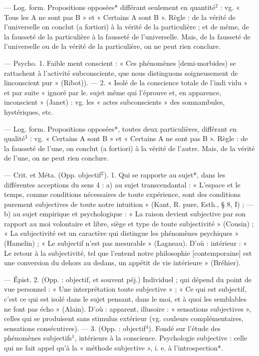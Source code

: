 \begin{itemize}[leftmargin=1cm, label=, itemsep=1pt]
 — Log. form. Propositions opposées* différant seulement en quantité$^2$ : vg.
« Tous les A ne sont pas B » et « Certains A sont B ». Règle : de la vérité
de l’universelle on conclut (a fortiori) à la vérité de la particulière ;
et de même, de la fausseté de la
particulière à la fausseté de l’universelle. Mais, de la fausseté de
l’universelle ou de la vérité de la
particulière, on ne peut rien conclure.

 — Psycho. 1. Faible
ment conscient : « Ces phénomènes
[demi-morbides) se rattachent à
l’activité subconsciente, que nous
distinguons soigneusement de linconscient pur » (Ribot)). — 2. « Isolé
de la conscience totale de l’indi
vidu » et par suite « ignoré par le.
sujet même qui l’éprouve et, en
apparence, inconscient » (Janet) :
vg. les « actes subconscients » des
somnambules, hystériques, etc.

 — Log. form. Propositions opposées*, toutes
deux particulières, différant en qualité$^3$ : vg. « Certains A sont B » et
« Certains A ne sont pas B ». Règle :
de la fausseté de l’une, on conclut
(a fortiori) à la vérité de l’autre.
Mais, de la vérité de l’une, on ne
peut rien conclure.

 — Crit. et Méta. (Opp.
objectif$^2$). 1. Qui se rapporte au
sujet*, dans les différentes acceptions du sens 4 : a) au sujet transcendantal : « L'espace et le temps,
comme conditions nécessaires de
toute expérience, sont des conditions purement subjectives de toute
notre intuition » (Kant, R. pure,
Esth., § 8, I) ; — b) au sujet empirique et psychologique : « La raison
devient subjective par son rapport
au moi volontaire et libre, siège et
type de toute subjectivité » (Cousin) ; « La subjectivité est un caractère qui distingue les phénomènes
psychiques » (Hamelin) ; « Le subjectif n’est pas mesurable » (Lagneau). D'où : intérieur : « Le retour
à la subjectivité, tel que l'entend
notre philosophie [contemporaine]
est une conversion du dehors au
dedans, un appétit de vie intérieure » (Bréhier).

— Épist. 2. (Opp. : objectif, et
souvent péj.) Individuel ; qui dépend
du point de vue personnel : « Une
interprétation toute subjective » ;
« Ce qui est subjectif, c’est ce qui
est isolé dans le sujet pensant, dans
le moi, et à quoi les semblables ne
font pas écho » (Alain). D'où : apparent, illusoire : « sensations subjectives », celles qui se produisent sans
stimulus extérieur (vg. couleurs
complémentaires, sensations consécutives). — 3. (Opp. : objectif$^4$).
Fondé sur l'étude des phénomènes
subjectifs$^1$, intérieurs à la conscience.
Psychologie subjective : celle qui ne
fait appel qu’à la « méthode subjective », i. e. à l’introspection*.


\end{itemize}
